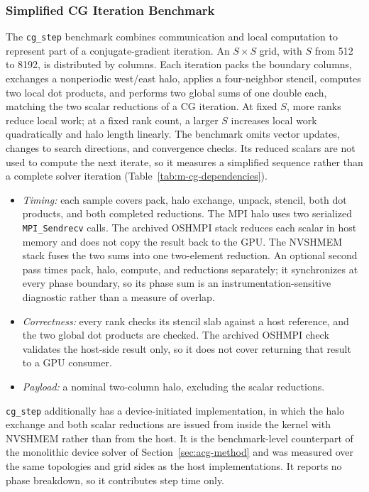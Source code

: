 \subsubsection{Simplified CG Iteration Benchmark}

The \texttt{cg\_step} benchmark combines communication and local computation to represent part of a conjugate-gradient iteration. An $S\times S$ grid, with $S$ from 512 to 8192, is distributed by columns. Each iteration packs the boundary columns, exchanges a nonperiodic west/east halo, applies a four-neighbor stencil, computes two local dot products, and performs two global sums of one double each, matching the two scalar reductions of a CG iteration. At fixed $S$, more ranks reduce local work; at a fixed rank count, a larger $S$ increases local work quadratically and halo length linearly. The benchmark omits vector updates, changes to search directions, and convergence checks. Its reduced scalars are not used to compute the next iterate, so it measures a simplified sequence rather than a complete solver iteration (Table~\ref{tab:m-cg-dependencies}).
\begin{itemize}
    \item \emph{Timing:} each sample covers pack, halo exchange, unpack, stencil, both dot products, and both completed reductions. The MPI halo uses two serialized \texttt{MPI\_Sendrecv} calls. The archived OSHMPI stack reduces each scalar in host memory and does not copy the result back to the GPU. The NVSHMEM stack fuses the two sums into one two-element reduction. An optional second pass times pack, halo, compute, and reductions separately; it synchronizes at every phase boundary, so its phase sum is an instrumentation-sensitive diagnostic rather than a measure of overlap.
    \item \emph{Correctness:} every rank checks its stencil slab against a host reference, and the two global dot products are checked. The archived OSHMPI check validates the host-side result only, so it does not cover returning that result to a GPU consumer.
    \item \emph{Payload:} a nominal two-column halo, excluding the scalar reductions.
\end{itemize}

\texttt{cg\_step} additionally has a device-initiated implementation, in which the halo exchange and both scalar reductions are issued from inside the kernel with NVSHMEM rather than from the host. It is the benchmark-level counterpart of the monolithic device solver of Section~\ref{sec:acg-method} and was measured over the same topologies and grid sides as the host implementations. It reports no phase breakdown, so it contributes step time only.


